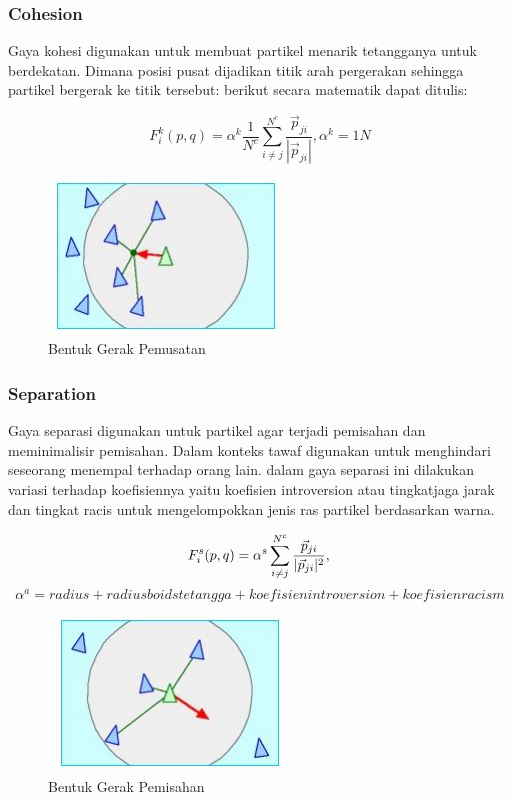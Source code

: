 \subsubsection{Cohesion}\label{sec:cohesion}
\hspace{0.5cm}Gaya kohesi digunakan untuk membuat partikel menarik tetangganya untuk berdekatan. Dimana posisi pusat dijadikan titik arah pergerakan sehingga partikel bergerak ke titik tersebut: berikut secara matematik dapat ditulis:

\begin{equation}
 F_i^k(p,q) = \alpha^k \dfrac{1}{N^c}\sum^{N^c}_{i \neq j}\dfrac{\vec{p}_{ji}}{|\vec{p}_{ji}|} , \alpha^k = 1N
\end{equation}
\begin{figure}
\centering
\includegraphics[scale=0.5]{gambar/cohesion}
\caption{Bentuk Gerak Pemusatan}
\end{figure}

\subsubsection{Separation}\label{sec:separation}
\hspace{0.5cm} Gaya separasi digunakan untuk partikel agar terjadi pemisahan dan meminimalisir pemisahan. Dalam konteks tawaf digunakan untuk menghindari seseorang menempal terhadap orang lain. dalam gaya separasi ini dilakukan variasi terhadap koefisiennya yaitu koefisien introversion atau tingkatjaga jarak dan tingkat racis untuk mengelompokkan jenis ras partikel berdasarkan warna.

\begin{equation}
 F_i^s(p,q) = \alpha^s \sum^{N^c}_{i \neq j}\dfrac{\vec{p}_{ji}}{|\vec{p}_{ji}|^2},\\
 \end{equation}
\begin{equation}
\alpha^a = radius + radius boids tetangga + koefisien introversion + koefisien racism
 \end{equation}

\begin{figure}
\centering
\includegraphics[scale=0.5]{gambar/separation}
\caption{Bentuk Gerak Pemisahan}
\end{figure}

